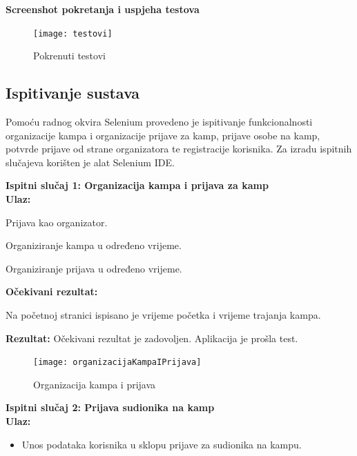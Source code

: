			\newpage
			
			\textbf{\large Screenshot pokretanja i uspjeha testova}
			
			\begin{figure}[h]
				\centering
				\texttt{[image: testovi]}
				\caption{Pokrenuti testovi}
			\end{figure}
			
			\newpage
			
			\subsection{Ispitivanje sustava}
			
			{Pomoću radnog okvira Selenium provedeno je ispitivanje funkcionalnosti organizacije kampa i organizacije prijave za kamp, prijave osobe na kamp, potvrde prijave od strane organizatora te registracije korisnika. Za izradu ispitnih slučajeva korišten je alat Selenium IDE.\\ }
			
			\textbf{Ispitni slučaj 1: Organizacija kampa i prijava za kamp\\}
				\indent\textbf{Ulaz:}
					\begin{packed_item}
						\item {Prijava kao organizator.}
						\item {Organiziranje kampa u određeno vrijeme.}
						\item {Organiziranje prijava u određeno vrijeme.}
					\end{packed_item}
			
				\textbf{Očekivani rezultat:}
					\begin{packed_item}
						\item {Na početnoj stranici ispisano je vrijeme početka i vrijeme trajanja kampa.}
					\end{packed_item}
			
				{\textbf{Rezultat:} Očekivani rezultat je zadovoljen. Aplikacija je prošla test.}
			
			\begin{figure}[h]
				\centering
				\texttt{[image: organizacijaKampaIPrijava]}
				\caption{Organizacija kampa i prijava}
			\end{figure}
			
			\clearpage
			
			\textbf{Ispitni slučaj 2: Prijava sudionika na kamp\\}
				\indent\textbf{Ulaz:}
					\begin{itemize}
						\item {Unos podataka korisnika u sklopu prijave za sudionika na kampu.}	
					\end{itemize}
				
